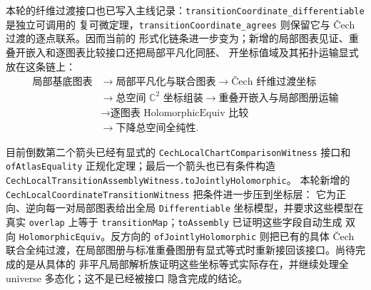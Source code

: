 \documentclass[UTF8,fontset=none,a4paper,11pt]{ctexart}
\begin{document}
\newpage
本轮的纤维过渡接口也已写入主线记录：\texttt{transitionCoordinate\_differentiable} 是独立可调用的
复可微定理，\texttt{transitionCoordinate\_agrees} 则保留它与 Čech 过渡的逐点联系。因而当前的
形式化链条进一步变为；新增的局部图表见证、重叠开嵌入和逐图表比较接口还把局部平凡化同胚、
开坐标值域及其拓扑运输显式放在这条链上：
\[
\begin{aligned}
\text{局部基底图表}
&\longrightarrow \text{局部平凡化与联合图表}
 \longrightarrow \text{Čech 纤维过渡坐标}\\
&\longrightarrow \text{总空间 }\mathbb C^2\text{ 坐标组装}
 \longrightarrow \text{重叠开嵌入与局部图册运输}\\
&\longrightarrow \text{逐图表 HolomorphicEquiv 比较}\\
&\longrightarrow \text{下降总空间全纯性}.
\end{aligned}
\]
\begin{sloppypar}
目前倒数第二个箭头已经有显式的 \texttt{CechLocalChartComparisonWitness} 接口和
\texttt{ofAtlasEquality} 正规化定理；最后一个箭头也已有条件构造
\texttt{CechLocalTransitionAssemblyWitness.}\allowbreak\texttt{toJointlyHolomorphic}。
本轮新增的 \texttt{CechLocalCoordinateTransitionWitness} 把条件进一步压到坐标层：
它为正向、逆向每一对局部图表给出全局 \texttt{Differentiable} 坐标模型，并要求这些模型在真实
\texttt{overlap} 上等于 \texttt{transitionMap}；\texttt{toAssembly} 已证明这些字段自动生成
双向 \texttt{HolomorphicEquiv}。反方向的 \texttt{ofJointlyHolomorphic} 则把已有的具体 Čech
联合全纯过渡，在局部图册与标准重叠图册有显式等式时重新接回该接口。尚待完成的是从具体的
非平凡局部解析族证明这些坐标等式实际存在，并继续处理全 universe 多态化；这不是已经被接口
隐含完成的结论。
\end{sloppypar}

\clearpage


\end{document}
